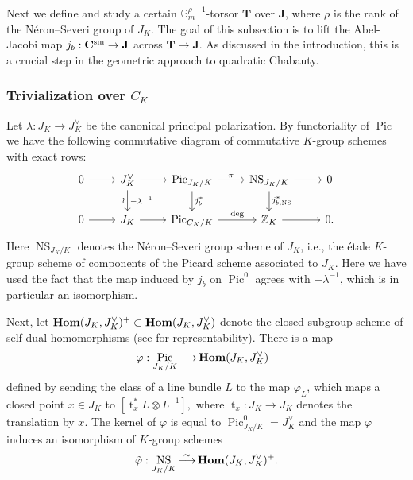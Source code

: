 \documentclass[11pt,oneside]{amsart}
\theoremstyle{plain}
\theoremstyle{definition}
\def\lra{{\longrightarrow}}
\def\G{{\bf G}}
\DeclareMathOperator{\NS}{NS}
\DeclareMathOperator{\Pic}{Pic}
\DeclareMathOperator{\Hombf}{{\bf Hom}}
\DeclareMathOperator{\tr}{t}
\def\TT{\mathbf{T}}
\def\Z{\mathbb{Z}}
\def\J{\mathbf{J}}
\def\sL{\mathscr{L}}
\def\G{\mathbb{G}}
\def\CC{\mathbf{C}}
\def\ra{\rightarrow}
\begin{document}
Next we define and study a certain $\G_m^{\rho-1}$-torsor $\TT$ over $\J$, where $\rho$ is the rank of the N\'eron--Severi group of $J_K$. The goal of this subsection is to lift the Abel-Jacobi map $j_b: \CC^{\textup{sm}} \ra \J$ across $\TT \ra \J$. As discussed in the introduction, this is a crucial step in the geometric approach to quadratic Chabauty. 

\subsubsection{Trivialization over $C_K$}

Let  $\lambda : J_K\lra J_K^\vee$ be the canonical principal polarization. By functoriality of $\Pic$ we have the following commutative diagram of commutative $K$-group schemes with exact rows: 
\begin{equation}\label{diag:NS}
\begin{tikzcd}[bend angle = 20]
  0 \arrow{r}
  & J_K^\vee \arrow{r} \arrow{d}{-\lambda^{-1}}[swap]{\wr}
  & \Pic_{J_K/K} \arrow{r}{\pi} \arrow{d}{j_b^*}
  & \NS_{J_K/K} \arrow{r} \arrow{d}{j_{b, \NS}^*}
  & 0 \\
  0 \arrow{r}
  & J_K \arrow{r}
  & \Pic_{C_K/K} \arrow{r}{\deg}
  & \Z_K \arrow{r}
  & 0.
\end{tikzcd}
\end{equation}
Here $\NS_{J_K/K}$ denotes the N\'eron--Severi group scheme of $J_K$, i.e., the \'etale $K$-group scheme of components of the Picard scheme associated to $J_K$. Here we have used the fact that the map induced by $j_b$ on $\Pic^0$ agrees with $-\lambda^{-1}$, which is in particular an isomorphism. 

Next, let $\Hombf(J_K, J_K^\vee)^{+} \subset \Hombf(J_K, J_K^\vee)$ denote the closed subgroup scheme of self-dual homomorphisms (see \cite[Proposition 7.14 \& \S 7.18]{EGM} for representability). There is a map 
$$
    \varphi : \Pic_{J_K/K}\lra \Hombf(J_K, J_K^\vee)^+ %
$$
defined by sending the class of a line bundle $L$ to the map $\varphi_L$, which maps a closed point $x\in J_K$ to $[\tr_x^* L\otimes L^{-1}],$ where $\tr_x : J_K\lra J_K$ denotes the translation by $x$. The kernel of $\varphi$ is equal to $\Pic^0_{J_K/K}=J_K^\vee$ and the map $\varphi$ induces an isomorphism of $K$-group schemes \cite[Corollary 11.3]{EGM}
\begin{equation}\label{map:phitilde}
    \tilde{\varphi} : \NS_{J_K/K}\overset{\sim}{\lra} \Hombf(J_K, J_K^\vee)^+.
\end{equation}
\end{document}
